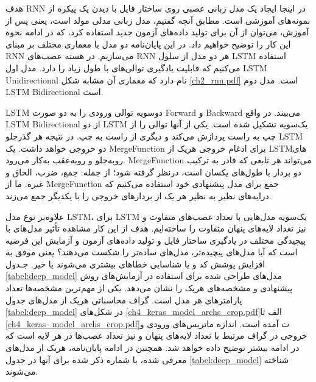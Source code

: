 هدف \gls{RNN} در اینجا ایجاد یک مدل زبانی عصبی روی ساختار فایل با دیدن یک پیکره از نمونه‌های آموزشی است. مطابق آنچه گفتیم، مدل زبانی مدلی مولد است، یعنی پس از آموزش، می‌توان از آن برای تولید داده‌های آزمون جدید استفاده کرد، که در ادامه نحوه این کار را توضیح خواهیم داد. در این پایان‌نامه دو مدل با معماری مختلف بر مبنای \gls{RNN} می‌سازیم. در هسته عصب‌های \gls{RNN} هر دو مدل از سلول \gls{LSTM} استفاده می‌کنیم که قابلیت یادگیری توالی‌های با طول زیاد را دارد. مدل اول \gls{LSTM} \gls{Unidirectional} نام دارد که معماری آن مشابه شکل \ref{ch2_rnn.pdf} است. مدل دوم \gls{LSTM} \gls{Bidirectional} است.

\gls{LSTM}
دوسویه توالی ورودی را به دو صورت \gls{Forward} و  \gls{Backward} می‌بیند. در واقع \gls{LSTM} \gls{Bidirectional} از دو \gls{LSTM} یک‌سویه تشکیل شده است. یکی از آنها توالی را از چپ به راست پردازش می‌کند و دیگری از راست به چپ. در نتیجه هر گذرجلو \gls{LSTM} دو خروجی خواهد داشت. یک \gls{MergeFunction} برای ادغام خروجی هریک از \gls{LSTM}های روبه‌جلو و روبه‌عقب به‌کار می‌رود. \gls{MergeFunction} می‌تواند هر تابعی که قادر به ترکیب دو بردار با طول‌های یکسان است، درنظر گرفته شود؛ از جمله: جمع، ضرب، الحاق و غیره. ما از \gls{MergeFunction} جمع برای مدل پیشنهادی خود استفاده می‌کنیم که درایه‌های نظیر به نظیر هر یک از بردارهای خروجی را با یکدیگر جمع می‌زند.

علاوه‌بر نوع مدل \gls{LSTM}، برای \gls{LSTM} یک‌سویه مدل‌هایی با تعداد عصب‌های متفاوت و نیز تعداد لایه‌های پنهان متفاوت را ساخته‌ایم. هدف از این کار مشاهده تأثیر مدل‌های با پیچیدگی مختلف در یادگیری ساختار فایل و تولید داده‌های آزمون و آزمایش این فرضیه است که آیا مدل‌های پیچیده‌تر، مدل‌های ساده‌تر را شکست می‌دهند؟ یعنی موفق به افزایش پوشش کد و یا شناسایی خطاهای بیشتری می‌شوند یا خیر. جـدول \ref{tabel:deep_model} مدل‌های طراحی شده برای استفاده در آزمایش‌های روش پیشنهادی و مشخصه‌های هریک را نشان می‌دهد. یکی از مهم‌ترین مشخصه‌ها تعداد پارامترهای هر مدل است. گراف محاسباتی هریک از مدل‌های جدول \ref{tabel:deep_model} در شکل‌های \ref{ch4_keras_model_archs_crop.pdf}الف تا \ref{ch4_keras_model_archs_crop.pdf}ت آمده است. اندازه ماتریس‌های ورودی و خروجی در گراف مرتبط با تعداد لایه‌های پنهان و نیز تعداد عصب‌ها در هر لایه است که در ادامه بیشتر توضیح داده خواهد شد. همچنین در ادامه پایان‌نامه، هریک از مدل‌های معرفی شده، با شماره ذکر شده برای آنها در جدول 
\ref{tabel:deep_model}
شناخته می‌شوند.

